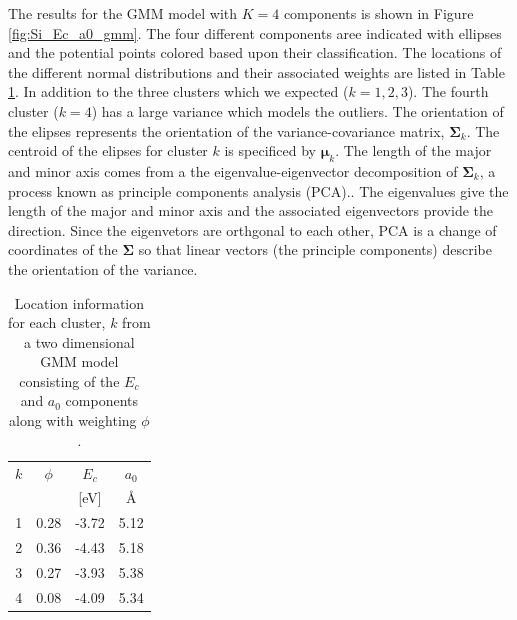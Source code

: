 The results for the GMM model with $K=4$ components is shown in Figure \ref{fig:Si_Ec_a0_gmm}.  The four different components aree indicated with ellipses and the potential points colored based upon their classification.  The locations of the different normal distributions and their associated weights are listed in Table \ref{tbl:sw_2parameter_gmm}.  In addition to the three clusters which we expected ($k=1,2,3$).  The fourth cluster ($k=4$) has a large variance which models the outliers.  The orientation of the elipses represents the orientation of the variance-covariance matrix, $\bm{\Sigma}_k$.
The centroid of the elipses for cluster $k$ is specificed by $\bm{\mu}_k$.  The length of the major and minor axis comes from a the eigenvalue-eigenvector decomposition of $\bm{\Sigma}_k$, a process known as principle components analysis (PCA).\cite{pearson1901_pca,hotelling1933_pca}.  The eigenvalues give the length of the major and minor axis and the associated eigenvectors provide the direction.  Since the eigenvetors are orthgonal to each other, PCA is a change of coordinates of the $\bm{\Sigma}$ so that linear vectors (the principle components) describe the orientation of the variance.

\begin{table}[ht]
	\centering
	\caption{Location information for each cluster, $k$  from a two dimensional GMM model consisting of the $E_c$ and $a_0$ components along with weighting $\phi$.}
	\label{tbl:sw_2parameter_gmm}
	\begin{tabular}{c c c c}
    \hline
    $k$ & $\phi$ & $E_c$ & $a_0$ \\
        &        & [eV]  & \AA   \\
    \hline
    1 & 0.28 & -3.72  & 5.12 \\
    2 & 0.36 & -4.43  & 5.18 \\
    3 & 0.27 & -3.93  & 5.38 \\
    4 & 0.08 & -4.09  & 5.34 \\
    \hline
  \end{tabular}
\end{table}

